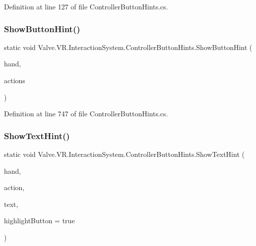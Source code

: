 Definition at line 127 of file Controller\+Button\+Hints.\+cs.

\mbox{\label{class_valve_1_1_v_r_1_1_interaction_system_1_1_controller_button_hints_afd53eaebcf77a92658798083cec70efb}} 
\subsubsection{\texorpdfstring{ShowButtonHint()}{ShowButtonHint()}}
{\footnotesize\ttfamily static void Valve.\+V\+R.\+Interaction\+System.\+Controller\+Button\+Hints.\+Show\+Button\+Hint (\begin{DoxyParamCaption}\item[{\mbox{\hyperlink{class_valve_1_1_v_r_1_1_interaction_system_1_1_hand}{Hand}}}]{hand,  }\item[{params \mbox{\hyperlink{interface_valve_1_1_v_r_1_1_i_steam_v_r___action___in___source}{I\+Steam\+V\+R\+\_\+\+Action\+\_\+\+In\+\_\+\+Source}} \mbox{[}$\,$\mbox{]}}]{actions }\end{DoxyParamCaption})\hspace{0.3cm}{\ttfamily [static]}}



Definition at line 747 of file Controller\+Button\+Hints.\+cs.

\mbox{\label{class_valve_1_1_v_r_1_1_interaction_system_1_1_controller_button_hints_a8b844addfa29feab6b59064e322a0ca8}} 
\subsubsection{\texorpdfstring{ShowTextHint()}{ShowTextHint()}}
{\footnotesize\ttfamily static void Valve.\+V\+R.\+Interaction\+System.\+Controller\+Button\+Hints.\+Show\+Text\+Hint (\begin{DoxyParamCaption}\item[{\mbox{\hyperlink{class_valve_1_1_v_r_1_1_interaction_system_1_1_hand}{Hand}}}]{hand,  }\item[{\mbox{\hyperlink{interface_valve_1_1_v_r_1_1_i_steam_v_r___action___in___source}{I\+Steam\+V\+R\+\_\+\+Action\+\_\+\+In\+\_\+\+Source}}}]{action,  }\item[{string}]{text,  }\item[{bool}]{highlight\+Button = {\ttfamily true} }\end{DoxyParamCaption})\hspace{0.3cm}{\ttfamily [static]}}



